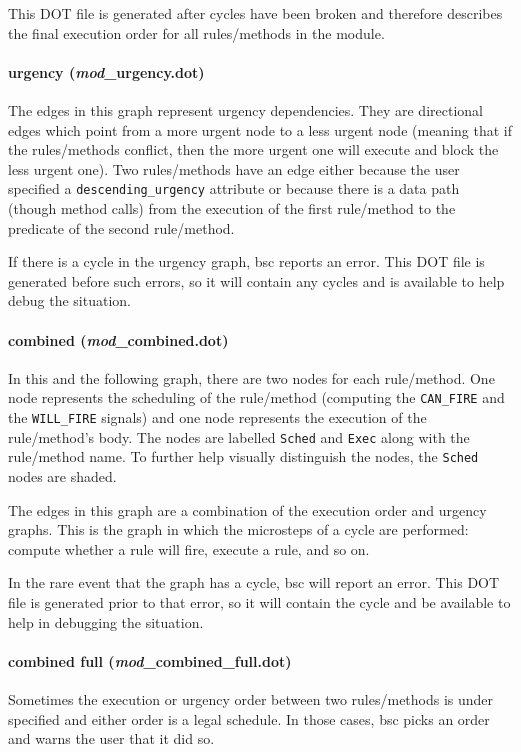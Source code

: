 \documentclass{article}
\newcommand{\te}[1]{\texttt{#1}}
\begin{document}
This DOT file is generated after cycles have been broken and therefore
describes the final execution order for all rules/methods in the
module.

\paragraph{urgency (\emph{mod}\_urgency.dot)}
The edges in this graph represent urgency dependencies.  They are
directional edges which point from a more urgent node to a less urgent
node (meaning that if the rules/methods conflict, then the more urgent
one will execute and block the less urgent one).  Two rules/methods
have an edge either because the user specified a \te{descending\_urgency}
attribute or because there is a data path (though method calls) from
the execution of the first rule/method to the predicate of the second
rule/method.

If there is a cycle in the urgency graph, bsc reports an error.
This DOT file is generated before such errors, so it will contain any
cycles and is available to help debug the situation.

\paragraph{combined (\emph{mod}\_combined.dot)}
In this and the following graph, there are two nodes for each rule/method.
One node represents the scheduling of the rule/method (computing the
\te{CAN\_FIRE} and the \te{WILL\_FIRE} signals)
and one node represents the execution of the rule/method's body.  The
nodes are labelled \te{Sched} and \te{Exec} along with the
rule/method name. To further help visually distinguish the nodes, the
\te{Sched} nodes are shaded.

The edges in this graph are a combination of the execution order
and urgency graphs.  This is the graph in which the
microsteps of a cycle are performed: compute whether a rule will fire,
execute a rule, and so on.

In the rare event that the graph has a cycle, bsc will report an error.
This DOT file is generated prior to that error, so it will contain the
cycle and be available to help in debugging the situation.

\paragraph{combined full (\emph{mod}\_combined\_full.dot)}

Sometimes the execution or urgency order between two rules/methods is
under specified and either order is a legal schedule.  In those cases, bsc
picks an order and warns the user that it did so.
\end{document}
